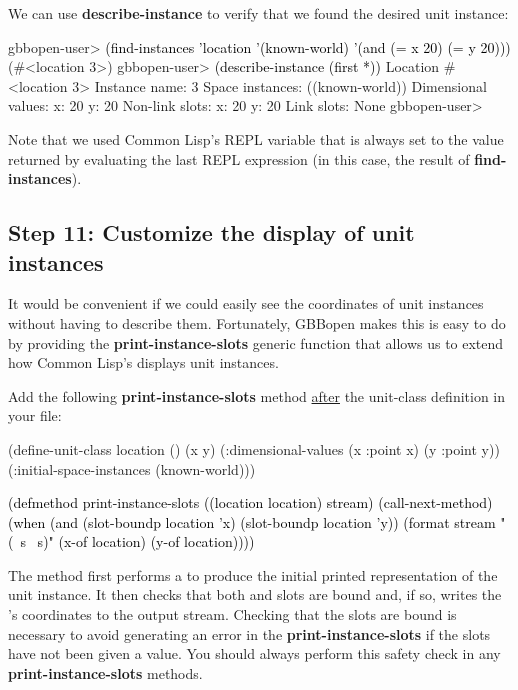 \documentclass[10pt,twoside,english,pdftex]{article}
\begin{document}
%
%
We can use \textbf{describe-instance} to verify that we found the desired
 unit instance:
%
\W\supp
\begin{example}
\textcolor{darkergray}{%
  gbbopen-user> \textcolor{black}{(find-instances 'location '(known-world)
                  '(and (= x 20) (= y 20)))}
   (#<location 3>)
  gbbopen-user> \textcolor{black}{(describe-instance (first *))}
  Location #<location 3>
    Instance name: 3
    Space instances: ((known-world))
    Dimensional values:
      x:  20
      y:  20
    Non-link slots:
      x:  20
      y:  20
    Link slots: None
  gbbopen-user>}
\end{example}
%
Note that we used Common Lisp's REPL \code{*} variable that is always set to
the value returned by evaluating the last REPL expression (in this case, the
result of \textbf{find-instances}).

\subsection*{Step 11: Customize the display of  unit instances}

%
%
It would be convenient if we could easily see the coordinates of
 unit instances without having to describe them.  Fortunately,
GBBopen makes this is easy to do by providing the
\textbf{print-instance-slots} generic function that allows us to extend how
Common Lisp's  displays  unit instances.

Add the following \textbf {print-instance-slots} method \underline{after} the
 unit-class definition in your 
file:
%
\W\supp
\begin{example}
\textcolor{darkergray}{%
  (define-unit-class location ()
    (x y)
    (:dimensional-values
      (x :point x)
      (y :point y))
    (:initial-space-instances (known-world)))

  \textcolor{black}{(defmethod print-instance-slots ((location location) stream)
    (call-next-method)
    (when (and (slot-boundp location 'x)
               (slot-boundp location 'y))
      (format stream " (~s ~s)"
              (x-of location)
              (y-of location))))}}
\end{example}
%
The method first performs a  to produce the initial
printed representation of the  unit instance.  It then checks
that both  and  slots are bound and, if so, writes the
's coordinates to the output stream.  Checking that the slots
are bound is necessary to avoid generating an error in the
\textbf{print-instance-slots} if the slots have not been given a value.  You
should always perform this safety check in any \textbf{print-instance-slots}
methods.
\end{document}
